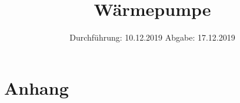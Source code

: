 

\subject{Versuchsnummer: 206}
\title{Wärmepumpe}
\date{%
  Durchführung: 10.12.2019
  \hspace{3em}
  Abgabe: 17.12.2019
}



\maketitle
\thispagestyle{empty}
\tableofcontents
\newpage





\section{Anhang}

\newpage
\nocite{*}
\printbibliography



